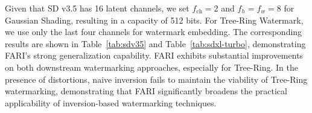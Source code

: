 \documentclass{article}
\begin{document}
Given that SD v3.5 has 16 latent channels, we set $f_{\text{ch}}=2$ and $f_h=f_w=8$ for Gaussian Shading, resulting in a capacity of 512 bits. For Tree-Ring Watermark, we use only the last four channels for watermark embedding. The corresponding results are shown in Table~\ref{tab:sdv35} and Table~\ref{tab:sdxl-turbo}, demonstrating FARI's strong generalization capability. FARI exhibits substantial improvements on both downstream watermarking approaches, especially for Tree-Ring. In the presence of distortions, naive inversion fails to maintain the viability of Tree-Ring watermarking, demonstrating that FARI significantly broadens the practical applicability of inversion-based watermarking techniques.

\begin{table}[ht]
\centering
\caption{Performance of naive inversion and FARI on SD v3.5M.}
\label{tab:sdv35}
\end{table}
\end{document}
